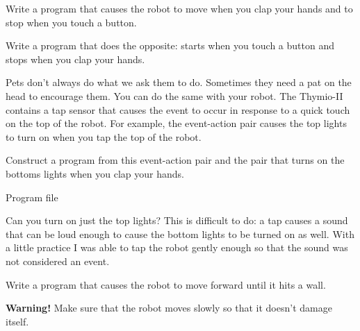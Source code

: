 

Write a program that causes the robot to move when you clap
your hands and to stop when you touch a button.

Write a program that does the opposite: starts when you touch a button
and stops when you clap your hands.



Pets don't always do what we ask them to do. Sometimes they need a pat
on the head to encourage them. You can do the same with your robot. The
Thymio-II contains a tap sensor that causes the event  to
occur in response to a quick touch on the top of the robot. For example,
the event-action pair  causes the top lights to turn on when
you tap the top of the robot.

Construct a program from this event-action pair and the pair 
that turns on the bottoms lights when you clap your hands.

{\raggedleft \hfill Program file }

Can you turn on just the top lights? This is difficult to do: a tap
causes a sound that can be loud enough to cause the bottom lights to be
turned on as well. With a little practice I was able to tap the robot
gently enough so that the sound was not considered an event.


Write a program that causes the robot to move forward until it hits a
wall.

\textbf{Warning!} Make sure that the robot moves slowly so that it
doesn't damage itself.

